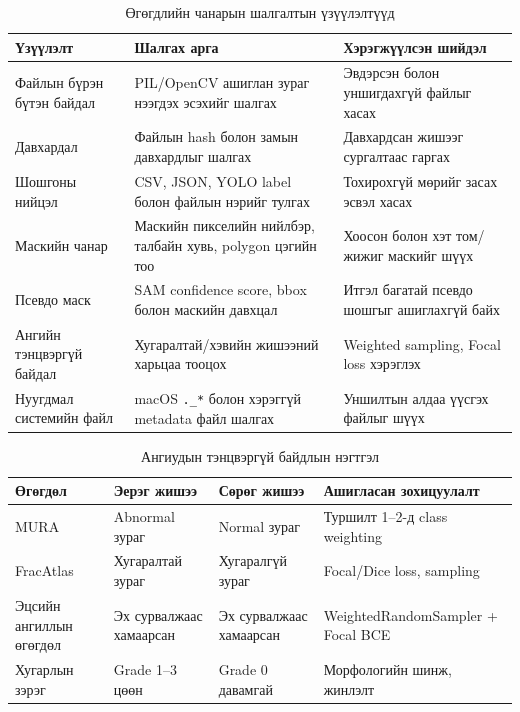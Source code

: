 \begin{table}[H]
    \centering
    \caption{Өгөгдлийн чанарын шалгалтын үзүүлэлтүүд}
    \label{tab:quality_indicators}
    \small
    \begin{tabular}{p{3.6cm} p{4.8cm} p{4.0cm}}
    \toprule
    \textbf{Үзүүлэлт} & \textbf{Шалгах арга} & \textbf{Хэрэгжүүлсэн шийдэл} \\
    \midrule
    Файлын бүрэн бүтэн байдал & PIL/OpenCV ашиглан зураг нээгдэх эсэхийг шалгах & Эвдэрсэн болон уншигдахгүй файлыг хасах \\
    Давхардал & Файлын hash болон замын давхардлыг шалгах & Давхардсан жишээг сургалтаас гаргах \\
    Шошгоны нийцэл & CSV, JSON, YOLO label болон файлын нэрийг тулгах & Тохирохгүй мөрийг засах эсвэл хасах \\
    Маскийн чанар & Маскийн пикселийн нийлбэр, талбайн хувь, polygon цэгийн тоо & Хоосон болон хэт том/жижиг маскийг шүүх \\
    Псевдо маск & SAM confidence score, bbox болон маскийн давхцал & Итгэл багатай псевдо шошгыг ашиглахгүй байх \\
    Ангийн тэнцвэргүй байдал & Хугаралтай/хэвийн жишээний харьцаа тооцох & Weighted sampling, Focal loss хэрэглэх \\
    Нуугдмал системийн файл & macOS \texttt{.\_*} болон хэрэггүй metadata файл шалгах & Уншилтын алдаа үүсгэх файлыг шүүх \\
    \bottomrule
    \end{tabular}
\end{table}

\begin{table}[H]
    \centering
    \caption{Ангиудын тэнцвэргүй байдлын нэгтгэл}
    \label{tab:class_balance}
    \small
    \begin{tabular}{p{3.2cm} p{3.2cm} p{3.0cm} p{3.5cm}}
    \toprule
    \textbf{Өгөгдөл} & \textbf{Эерэг жишээ} & \textbf{Сөрөг жишээ} & \textbf{Ашигласан зохицуулалт} \\
    \midrule
    MURA & Abnormal зураг & Normal зураг & Туршилт 1--2-д class weighting \\
    FracAtlas & Хугаралтай зураг & Хугаралгүй зураг & Focal/Dice loss, sampling \\
    Эцсийн ангиллын өгөгдөл & Эх сурвалжаас хамаарсан & Эх сурвалжаас хамаарсан & WeightedRandomSampler + Focal BCE \\
    Хугарлын зэрэг & Grade 1--3 цөөн & Grade 0 давамгай & Морфологийн шинж, жинлэлт \\
    \bottomrule
    \end{tabular}
\end{table}

